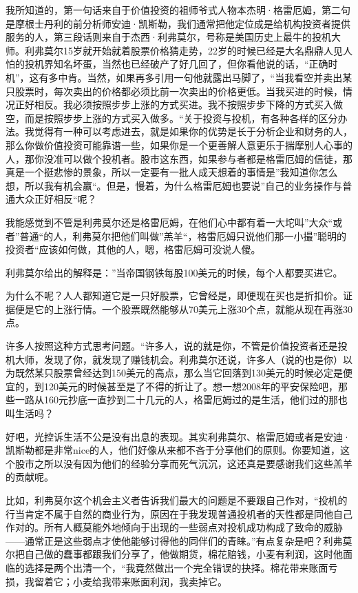 我所知道的，第一句话来自于价值投资的祖师爷式人物本杰明·格雷厄姆，第二句是摩根士丹利的前分析师安迪·凯斯勒，我们通常把他定位成是给机构投资者提供服务的人，第三段话则来自于杰西·利弗莫尔，号称是美国历史上最牛的投机大师。利弗莫尔15岁就开始就着股票价格猜走势，22岁的时候已经是大名鼎鼎人见人怕的投机界知名坏蛋，当然也已经破产了好几回了，但你看他说的话，``正确时机''，这有多中肯。当然，如果再多引用一句他就露出马脚了，``当我看空并卖出某只股票时，每次卖出的价格都必须比前一次卖出的价格更低。当我买进的时候，情况正好相反。我必须按照步步上涨的方式买进。我不按照步步下降的方式买入做空，而是按照步步上涨的方式买入做多。``关于投资与投机，有各种各样的区分办法。我觉得有一种可以考虑进去，就是如果你的优势是长于分析企业和财务的人，那么你做价值投资可能靠谱一些，如果你是一个更善解人意更乐于揣摩别人心事的人，那你没准可以做个投机者。股市这东西，如果参与者都是格雷厄姆的信徒，那真是一个挺悲惨的景象，所以一定要有一批人成天想着的事情是''我知道你怎么想，所以我有机会赢``。但是，慢着，为什么格雷厄姆也要说''自己的业务操作与普通大众正好相反``呢？

我能感觉到不管是利弗莫尔还是格雷厄姆，在他们心中都有着一大坨叫''大众``或者''普通``的人，利弗莫尔把他们叫做''羔羊``，格雷厄姆只说他们那一小撮''聪明的投资者``应该如何做，其他的人，嗯，格雷厄姆可没说人傻。

利弗莫尔给出的解释是：''当帝国钢铁每股100美元的时候，每个人都要买进它。

为什么不呢？人人都知道它是一只好股票，它曾经是，即便现在买也是折扣价。证据便是它的上涨行情。一个股票既然能够从70美元上涨30个点，就能从现在再涨30点。

许多人按照这种方式思考问题。``许多人，说的就是你，不管是价值投资者还是投机大师，发现了你，就发现了赚钱机会。利弗莫尔还说，许多人（说的也是你）以为既然某只股票曾经达到150美元的高点，那么当它回落到130美元的时候必定是便宜的，到120美元的时候甚至是了不得的折让了。想一想2008年的平安保险吧，那些一路从160元抄底一直抄到二十几元的人，格雷厄姆过的是生活，他们过的那也叫生活吗？

好吧，光控诉生活不公是没有出息的表现。其实利弗莫尔、格雷厄姆或者是安迪·凯斯勒都是非常nice的人，他们好像从来都不吝于分享他们的原则。你要知道，这个股市之所以没有因为他们的经验分享而死气沉沉，这还真是要感谢我们这些羔羊的贡献呢。

比如，利弗莫尔这个机会主义者告诉我们最大的问题是不要跟自己作对，``投机的行当肯定不属于自然的商业行为，原因在于我发现普通投机者的天性都是同他自己作对的。所有人概莫能外地倾向于出现的一些弱点对投机成功构成了致命的威胁------通常正是这些弱点才使他能够讨得他的同伴们的青睐。''有点复杂是吧？利弗莫尔把自己做的蠢事都跟我们分享了，他做期货，棉花赔钱，小麦有利润，这时他面临的选择是两个出清一个，``我竟然做出一个完全错误的抉择。棉花带来账面亏损，我留着它；小麦给我带来账面利润，我卖掉它。

